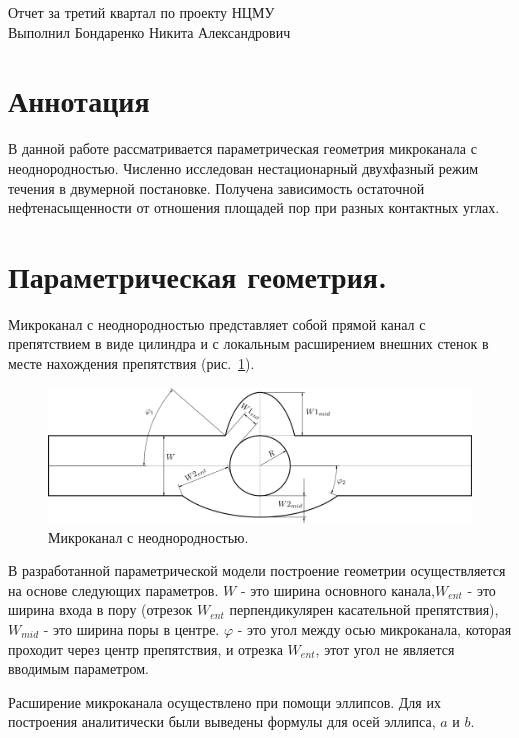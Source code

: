 \documentclass[14pt,a4paper]{article}
\begin{document}
    
    Отчет за третий квартал по проекту НЦМУ\\
    
    Выполнил Бондаренко Никита Александрович
    
    \section*{Аннотация}
    
    В данной работе рассматривается параметрическая геометрия микроканала с неоднородностью. Численно исследован нестационарный двухфазный режим течения в двумерной постановке. Получена зависимость остаточной нефтенасыщенности от отношения площадей пор при разных контактных углах.
    
    \section*{Параметрическая геометрия.}
    
    Микроканал с неоднородностью представляет собой	прямой канал с препятствием в виде цилиндра и с локальным расширением внешних стенок в месте нахождения препятствия (рис.~\ref{fig:HSgeom}). 
    
    \begin{figure}[H]
        \centering
        \includegraphics[width = 1\linewidth]{heleShawCellGeom}
        \caption{Микроканал с неоднородностью.}
        \label{fig:HSgeom}
    \end{figure}
    
    В разработанной параметрической модели построение геометрии осуществляется на основе следующих параметров. $W$ - это ширина основного канала,$W_{ent}$ - это ширина входа в пору (отрезок $W_{ent}$ перпендикулярен касательной препятствия), $W_{mid}$ - это ширина поры в центре. $\varphi$ - это угол между осью микроканала, которая проходит через центр препятствия, и отрезка $W_{ent}$, этот угол не является вводимым параметром.
    
    Расширение микроканала осуществлено при помощи эллипсов. Для их построения аналитически были выведены формулы для осей эллипса, $a$ и $b$.
    
\end{document}

